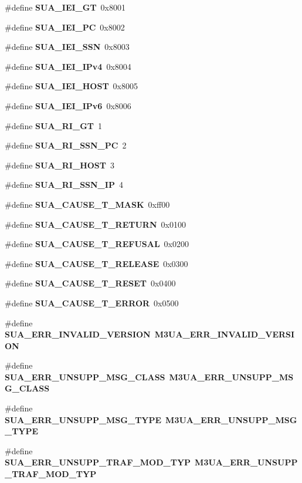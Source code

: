 \begin{DoxyCompactItemize}
\item 
\#define {\bf S\+U\+A\+\_\+\+I\+E\+I\+\_\+\+GT}~0x8001
\item 
\#define {\bf S\+U\+A\+\_\+\+I\+E\+I\+\_\+\+PC}~0x8002
\item 
\#define {\bf S\+U\+A\+\_\+\+I\+E\+I\+\_\+\+S\+SN}~0x8003
\item 
\#define {\bf S\+U\+A\+\_\+\+I\+E\+I\+\_\+\+I\+Pv4}~0x8004
\item 
\#define {\bf S\+U\+A\+\_\+\+I\+E\+I\+\_\+\+H\+O\+ST}~0x8005
\item 
\#define {\bf S\+U\+A\+\_\+\+I\+E\+I\+\_\+\+I\+Pv6}~0x8006
\item 
\#define {\bf S\+U\+A\+\_\+\+R\+I\+\_\+\+GT}~1
\item 
\#define {\bf S\+U\+A\+\_\+\+R\+I\+\_\+\+S\+S\+N\+\_\+\+PC}~2
\item 
\#define {\bf S\+U\+A\+\_\+\+R\+I\+\_\+\+H\+O\+ST}~3
\item 
\#define {\bf S\+U\+A\+\_\+\+R\+I\+\_\+\+S\+S\+N\+\_\+\+IP}~4
\item 
\#define {\bf S\+U\+A\+\_\+\+C\+A\+U\+S\+E\+\_\+\+T\+\_\+\+M\+A\+SK}~0xff00
\item 
\#define {\bf S\+U\+A\+\_\+\+C\+A\+U\+S\+E\+\_\+\+T\+\_\+\+R\+E\+T\+U\+RN}~0x0100
\item 
\#define {\bf S\+U\+A\+\_\+\+C\+A\+U\+S\+E\+\_\+\+T\+\_\+\+R\+E\+F\+U\+S\+AL}~0x0200
\item 
\#define {\bf S\+U\+A\+\_\+\+C\+A\+U\+S\+E\+\_\+\+T\+\_\+\+R\+E\+L\+E\+A\+SE}~0x0300
\item 
\#define {\bf S\+U\+A\+\_\+\+C\+A\+U\+S\+E\+\_\+\+T\+\_\+\+R\+E\+S\+ET}~0x0400
\item 
\#define {\bf S\+U\+A\+\_\+\+C\+A\+U\+S\+E\+\_\+\+T\+\_\+\+E\+R\+R\+OR}~0x0500
\item 
\#define {\bf S\+U\+A\+\_\+\+E\+R\+R\+\_\+\+I\+N\+V\+A\+L\+I\+D\+\_\+\+V\+E\+R\+S\+I\+ON}~{\bf M3\+U\+A\+\_\+\+E\+R\+R\+\_\+\+I\+N\+V\+A\+L\+I\+D\+\_\+\+V\+E\+R\+S\+I\+ON}
\item 
\#define {\bf S\+U\+A\+\_\+\+E\+R\+R\+\_\+\+U\+N\+S\+U\+P\+P\+\_\+\+M\+S\+G\+\_\+\+C\+L\+A\+SS}~{\bf M3\+U\+A\+\_\+\+E\+R\+R\+\_\+\+U\+N\+S\+U\+P\+P\+\_\+\+M\+S\+G\+\_\+\+C\+L\+A\+SS}
\item 
\#define {\bf S\+U\+A\+\_\+\+E\+R\+R\+\_\+\+U\+N\+S\+U\+P\+P\+\_\+\+M\+S\+G\+\_\+\+T\+Y\+PE}~{\bf M3\+U\+A\+\_\+\+E\+R\+R\+\_\+\+U\+N\+S\+U\+P\+P\+\_\+\+M\+S\+G\+\_\+\+T\+Y\+PE}
\item 
\#define {\bf S\+U\+A\+\_\+\+E\+R\+R\+\_\+\+U\+N\+S\+U\+P\+P\+\_\+\+T\+R\+A\+F\+\_\+\+M\+O\+D\+\_\+\+T\+YP}~{\bf M3\+U\+A\+\_\+\+E\+R\+R\+\_\+\+U\+N\+S\+U\+P\+P\+\_\+\+T\+R\+A\+F\+\_\+\+M\+O\+D\+\_\+\+T\+YP}

\end{DoxyCompactItemize}
